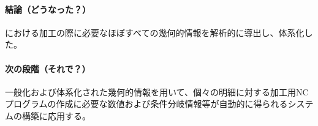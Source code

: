 {\paragraph*{結論（どうなった？）}
\DMC における加工の際に必要なほぼすべての幾何的情報を解析的に導出し、体系化した。
\tcbline*
\paragraph*{次の段階（それで？）}
一般化および体系化された幾何的情報を用いて、個々の明細に対する加工用NCプログラムの作成に必要な数値および条件分岐情報等が自動的に得られるシステムの構築に応用する。
}














\begin{appendices}
\Appendixpart



{\small}
\end{appendices}

